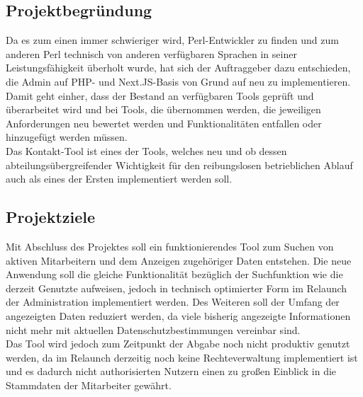 \vfill
\pagebreak

\subsection{Projektbegründung}
    Da es zum einen immer schwieriger wird, Perl-Entwickler zu finden und zum anderen Perl technisch von anderen verfügbaren Sprachen in seiner Leistungsfähigkeit überholt wurde, hat sich der Auftraggeber dazu entschieden, die Admin auf PHP- und Next.JS-Basis von Grund auf neu zu implementieren. Damit geht einher, dass der Bestand an verfügbaren Tools geprüft und überarbeitet wird und bei Tools, die übernommen werden, die jeweiligen Anforderungen neu bewertet werden und Funktionalitäten entfallen oder hinzugefügt werden müssen.\\
    Das Kontakt-Tool ist eines der Tools, welches neu und ob dessen abteilungsübergreifender Wichtigkeit für den reibungslosen betrieblichen Ablauf auch als eines der Ersten implementiert werden soll.

\subsection{Projektziele}
    Mit Abschluss des Projektes soll ein funktionierendes Tool zum Suchen von aktiven Mitarbeitern und dem Anzeigen zugehöriger Daten entstehen. Die neue Anwendung soll die gleiche Funktionalität bezüglich der Suchfunktion wie die derzeit Genutzte aufweisen, jedoch in technisch optimierter Form im Relaunch der Administration implementiert werden. Des Weiteren soll der Umfang der angezeigten Daten reduziert werden, da viele bisherig angezeigte Informationen nicht mehr mit aktuellen Datenschutzbestimmungen vereinbar sind.\\
    Das Tool wird jedoch zum Zeitpunkt der Abgabe noch nicht produktiv genutzt werden, da im Relaunch derzeitig noch keine Rechteverwaltung implementiert ist und es dadurch nicht authorisierten Nutzern einen zu großen Einblick in die Stammdaten der Mitarbeiter gewährt.

\vfill
\pagebreak